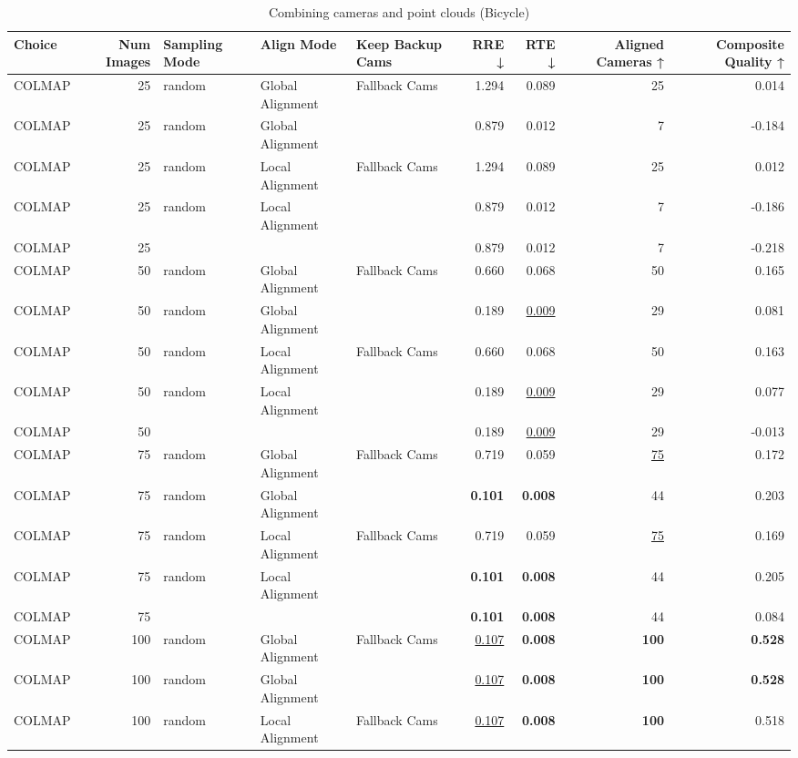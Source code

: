 \begin{table}[H]
\caption{Combining cameras and point clouds (Bicycle)}
\label{tab:07_combined_align_bicycle}
\begin{tabular}{lrlllrrrr}
\toprule
Choice & Num Images & Sampling Mode & Align Mode & Keep Backup Cams & RRE ↓ & RTE ↓ & Aligned Cameras ↑ & Composite Quality ↑ \\
\midrule
COLMAP & 25 & random & Global Alignment & Fallback Cams & 1.294 & 0.089 & 25 & 0.014 \\
COLMAP & 25 & random & Global Alignment &  & 0.879 & 0.012 & 7 & -0.184 \\
COLMAP & 25 & random & Local Alignment & Fallback Cams & 1.294 & 0.089 & 25 & 0.012 \\
COLMAP & 25 & random & Local Alignment &  & 0.879 & 0.012 & 7 & -0.186 \\
COLMAP & 25 &  &  &  & 0.879 & 0.012 & 7 & -0.218 \\
COLMAP & 50 & random & Global Alignment & Fallback Cams & 0.660 & 0.068 & 50 & 0.165 \\
COLMAP & 50 & random & Global Alignment &  & 0.189 & \underline{0.009} & 29 & 0.081 \\
COLMAP & 50 & random & Local Alignment & Fallback Cams & 0.660 & 0.068 & 50 & 0.163 \\
COLMAP & 50 & random & Local Alignment &  & 0.189 & \underline{0.009} & 29 & 0.077 \\
COLMAP & 50 &  &  &  & 0.189 & \underline{0.009} & 29 & -0.013 \\
COLMAP & 75 & random & Global Alignment & Fallback Cams & 0.719 & 0.059 & \underline{75} & 0.172 \\
COLMAP & 75 & random & Global Alignment &  & \textbf{0.101} & \textbf{0.008} & 44 & 0.203 \\
COLMAP & 75 & random & Local Alignment & Fallback Cams & 0.719 & 0.059 & \underline{75} & 0.169 \\
COLMAP & 75 & random & Local Alignment &  & \textbf{0.101} & \textbf{0.008} & 44 & 0.205 \\
COLMAP & 75 &  &  &  & \textbf{0.101} & \textbf{0.008} & 44 & 0.084 \\
COLMAP & 100 & random & Global Alignment & Fallback Cams & \underline{0.107} & \textbf{0.008} & \textbf{100} & \textbf{0.528} \\
COLMAP & 100 & random & Global Alignment &  & \underline{0.107} & \textbf{0.008} & \textbf{100} & \textbf{0.528} \\
COLMAP & 100 & random & Local Alignment & Fallback Cams & \underline{0.107} & \textbf{0.008} & \textbf{100} & 0.518 \\

\end{tabular}
\end{table}
